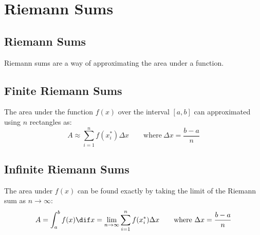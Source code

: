 \section{Riemann Sums}
\subsection{Riemann Sums}
	Riemann sums are a way of approximating the area under a function.
\subsection{Finite Riemann Sums}
	The area under the function $f(x)$ over the interval $[a,b]$ can approximated using $n$ rectangles as:
	\[A \approx \sum_{i=1}^n f(x_i^*) \Delta x \qquad \text{where}\ \Delta x = \frac{b - a}{n}\]
\subsection{Infinite Riemann Sums}
	The area under $f(x)$ can be found exactly by taking the limit of the Riemann sum as $n \to \infty$:
	\[A = \int_a^b f(x) \dif x = \lim_{n \to \infty} \sum_{i=1}^n f(x_i^*) \Delta x \qquad \text{where}\ \Delta x = \frac{b - a}{n}\]
